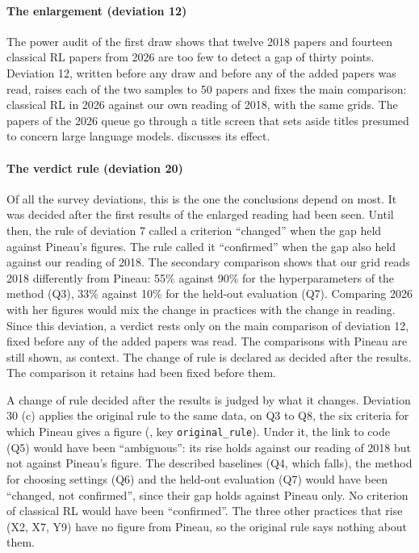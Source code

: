 \paragraph{The enlargement (deviation 12)} The power audit of the first draw shows that twelve 2018
papers and fourteen classical RL papers from 2026 are too few to detect a gap of thirty points.
Deviation 12, written before any draw and before any of the added papers was read, raises each of
the two samples to 50 papers and fixes the main comparison: classical RL in 2026 against our own
reading of 2018, with the same grids. The papers of the 2026 queue go through a title screen that
sets aside titles presumed to concern large language models.  discusses its
effect.

\paragraph{The verdict rule (deviation 20)} Of all the survey deviations, this is the one the
conclusions depend on most. It was decided after the first results of the enlarged reading had been seen. Until
then, the rule of deviation 7 called a criterion \enquote{changed} when the gap held against
Pineau's figures. The rule called it \enquote{confirmed} when the gap also held against our reading
of 2018. The secondary comparison shows that our grid reads 2018 differently from Pineau: 55\% against
90\% for the hyperparameters of the method (Q3), 33\% against 10\% for the held-out evaluation (Q7).
Comparing 2026 with her figures would mix the change in practices with the change in reading. Since
this deviation, a verdict rests only on the main comparison of deviation 12, fixed before any of the
added papers was read. The comparisons with Pineau are still shown, as context. The change of rule is
declared as decided after the results. The comparison it retains had been fixed before them.

A change of rule decided after the results is judged by what it changes. Deviation 30 (c) applies the
original rule to the same data, on Q3 to Q8, the six criteria for which Pineau gives a figure
(, key \texttt{original\_rule}). Under it, the link to code (Q5) would
have been \enquote{ambiguous}: its rise holds against our reading of 2018 but not against Pineau's
figure. The described baselines (Q4, which falls), the method for choosing settings (Q6) and the
held-out evaluation (Q7) would have been \enquote{changed, not confirmed}, since their gap holds
against Pineau only. No criterion of classical RL would have been \enquote{confirmed}. The three
other practices that rise (X2, X7, Y9) have no figure from Pineau, so the original rule says nothing
about them.

